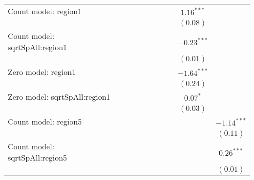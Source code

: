 \begin{center}
\begin{longtable}{l c c c c c c c c c}
Count model: region1           &                &                &                &                 &                &                 &                 & $1.16^{***}$    &                \\
                               &                &                &                &                 &                &                 &                 & $(0.08)$        &                \\
Count model: sqrtSpAll:region1 &                &                &                &                 &                &                 &                 & $-0.23^{***}$   &                \\
                               &                &                &                &                 &                &                 &                 & $(0.01)$        &                \\
Zero model: region1            &                &                &                &                 &                &                 &                 & $-1.64^{***}$   &                \\
                               &                &                &                &                 &                &                 &                 & $(0.24)$        &                \\
Zero model: sqrtSpAll:region1  &                &                &                &                 &                &                 &                 & $0.07^{*}$      &                \\
                               &                &                &                &                 &                &                 &                 & $(0.03)$        &                \\
Count model: region5           &                &                &                &                 &                &                 &                 &                 & $-1.14^{***}$  \\
                               &                &                &                &                 &                &                 &                 &                 & $(0.11)$       \\
Count model: sqrtSpAll:region5 &                &                &                &                 &                &                 &                 &                 & $0.26^{***}$   \\
                               &                &                &                &                 &                &                 &                 &                 & $(0.01)$       \\

\end{longtable}
\end{center}
